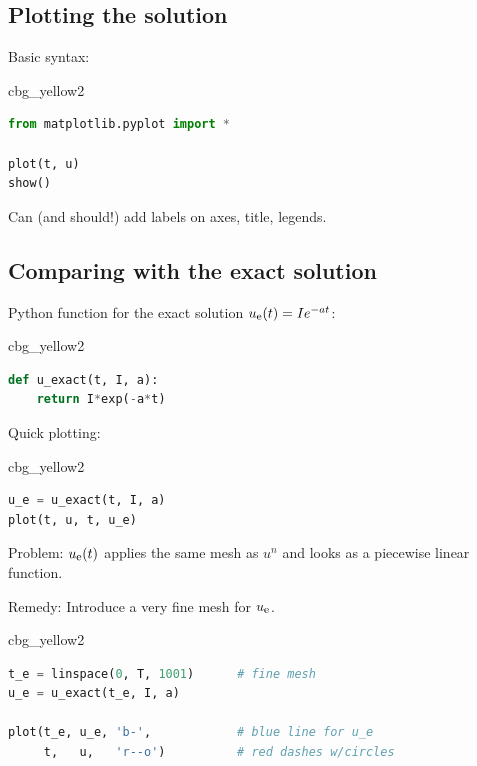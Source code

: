 \documentclass[%
oneside,                 %
final,                   %
10pt]{article}
\newenvironment{_cod_tight}[1]{
   \def\FrameCommand{\colorbox{#1}}
   \FrameRule0.6pt\MakeFramed {\FrameRestore}\vskip3mm}
   {\vskip0mm\endMakeFramed}
\newenvironment{cod}[1]{
\bgroup\rmfamily
\fboxsep=0mm\relax
\begin{_cod_tight}{#1}
\list{}{\parsep=-2mm\parskip=0mm\topsep=0pt\leftmargin=2mm
\rightmargin=2\leftmargin\leftmargin=4pt\relax}
\item\relax}
{\endlist\end{_cod_tight}\egroup}
\begin{document}
\subsection*{Plotting the solution}

Basic syntax:

\begin{cod}{cbg_yellow2}\begin{lstlisting}[language=Python,style=simple,xleftmargin=2mm]
from matplotlib.pyplot import *

plot(t, u)
show()
\end{lstlisting}\end{cod}
\noindent

Can (and should!) add labels on axes, title, legends.

\subsection*{Comparing with the exact solution}

Python function for the exact solution $\uex(t)=Ie^{-at}$:

\begin{cod}{cbg_yellow2}\begin{lstlisting}[language=Python,style=simple,xleftmargin=2mm]
def u_exact(t, I, a):
    return I*exp(-a*t)
\end{lstlisting}\end{cod}
\noindent

Quick plotting:

\begin{cod}{cbg_yellow2}\begin{lstlisting}[language=Python,style=simple,xleftmargin=2mm]
u_e = u_exact(t, I, a)
plot(t, u, t, u_e)
\end{lstlisting}\end{cod}
\noindent

Problem: $\uex(t)$ applies the same mesh as $u^n$ and
looks as a piecewise linear function.

Remedy: Introduce a very fine mesh for $\uex$.

\begin{cod}{cbg_yellow2}\begin{lstlisting}[language=Python,style=simple,xleftmargin=2mm]
t_e = linspace(0, T, 1001)      # fine mesh
u_e = u_exact(t_e, I, a)

plot(t_e, u_e, 'b-',            # blue line for u_e
     t,   u,   'r--o')          # red dashes w/circles
\end{lstlisting}\end{cod}
\noindent
\end{document}
